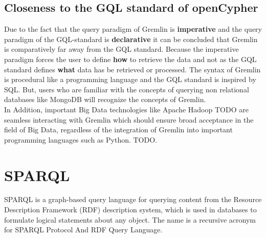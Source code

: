 \subsection{Closeness to the GQL standard of openCypher}
Due to the fact that the query paradigm of Gremlin is \textbf{imperative} and the
query paradigm of the GQL-standard is \textbf{declarative} it can be concluded that Gremlin 
is comparatively far away from the GQL standard. Because the imperative paradigm 
forces the user to define \textbf{how} to retrieve the data and not as the GQL standard
defines \textbf{what} data has be retrieved or processed.
The syntax of Gremlin is procedural like a programming language and the GQL standard is
inspired by SQL.\newline
But, users who are familiar with the concepts of querying non relational databases like 
MongoDB will recognize the concepts of Gremlin.\\
In Addition, important Big Data technologies like Apache Hadoop TODO are seamless interacting
with Gremlin which should ensure broad acceptance in the field of Big Data, 
regardless of the integration of Gremlin into important programming languages such as Python.
TODO.

\section{SPARQL}
SPARQL is a graph-based query language for querying content from the Resource Description Framework (RDF) description system,
which is used in databases to formulate logical statements about any object. 
The name is a recursive acronym for SPARQL Protocol And RDF Query Language.
